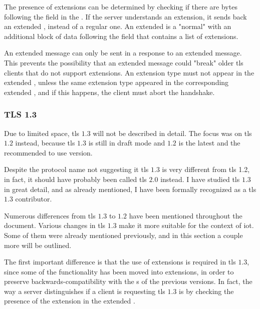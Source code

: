 \documentclass{llncs}
\begin{document}
The presence of extensions can be determined by checking if there are bytes
following the  field in the .
If the server understands an extension, it sends back an extended ,
instead of a regular one. An extended  is a "normal"
 with an additional block of data following the
 field that contains a list of extensions.

An extended  message can only be sent in a response to an
extended  message. This prevents the possibility that an extended
 message could "break" older \gls{tls} clients that do not
support extensions. An extension type must not appear in the
extended , unless the same extension type appeared in the
corresponding extended , and if this happens, the client must abort the handshake.

\subsubsection{TLS 1.3}

Due to limited space, \gls{tls} $1.3$\cite{I-D.ietf-tls-tls13} will not be described in detail. The focus was on \gls{tls} $1.2$ instead, because \gls{tls} $1.3$ is still in draft
mode and $1.2$ is the latest and the recommended to use version.

Despite the protocol name not suggesting it \gls{tls} $1.3$ is
very different from \gls{tls} 1.2, in fact, it should have probably been called
\gls{tls} $2.0$ instead. I have studied \gls{tls} $1.3$ in great detail, and as already mentioned,
I have been formally recognized as a \gls{tls} $1.3$ contributor.

Numerous differences from \gls{tls} $1.3$ to $1.2$ have been mentioned throughout the document.
Various changes in \gls{tls} $1.3$ make it more suitable for the context
of \gls{iot}. Some of them were already mentioned previously, and in this section a couple more will be outlined.

The first important difference is that the use of extensions is required in \gls{tls} $1.3$,
since some of the functionality has been moved into extensions, in order to preserve
backwards-compatibility with the s of the previous versions.
In fact, the way a server distinguishes if a client is requesting \gls{tls} $1.3$
is by checking the presence of the  extension in the
extended .
\end{document}

